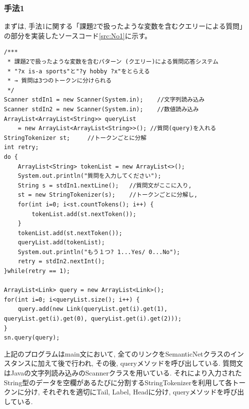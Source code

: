 ﻿\documentclass[uplatex,12pt]{jsarticle}
\begin{document}
\subsubsection{手法1}
まずは, 手法1に関する「課題2で扱ったような変数を含むクエリーによる質問」の部分を実装したソースコード\ref{src:No1}に示す。
\begin{lstlisting}[caption=クエリーの形に添った質問応答, label=src:No1]
/***
 * 課題2で扱ったような変数を含むパターン (クエリー)による質問応答システム
 * "?x is-a sports"と"?y hobby ?x"をとらえる
 * → 質問は3つのトークンに分けられる
 */
Scanner stdIn1 = new Scanner(System.in);	//文字列読み込み
Scanner stdIn2 = new Scanner(System.in);	//数値読み込み
ArrayList<ArrayList<String>> queryList 
    = new ArrayList<ArrayList<String>>(); //質問(query)を入れる
StringTokenizer st;		//トークンごとに分解
int retry;
do {
	ArrayList<String> tokenList = new ArrayList<>();
	System.out.println("質問を入力してください");
	String s = stdIn1.nextLine(); 	//質問文がここに入り,
	st = new StringTokenizer(s);	//トークンごとに分解し,
	for(int i=0; i<st.countTokens(); i++) {
		tokenList.add(st.nextToken());
	}
	tokenList.add(st.nextToken());
	queryList.add(tokenList);
	System.out.println("もう１つ? 1...Yes/ 0...No");
	retry = stdIn2.nextInt();
}while(retry == 1);

ArrayList<Link> query = new ArrayList<Link>();
for(int i=0; i<queryList.size(); i++) {
	query.add(new Link(queryList.get(i).get(1), queryList.get(i).get(0), queryList.get(i).get(2)));
}
sn.query(query);
\end{lstlisting}

上記のプログラムはmain文において, 全てのリンクをSemanticNetクラスのインスタンスに加えて後で行われ, その後, queryメソッドを呼び出している. 質問文はJavaの文字列読み込みのScannerクラスを用いている. それにより入力されたString型のデータを空欄があるたびに分割するStringTokenizerを利用して各トークンに分け, それぞれを適切にTail, Label, Headに分け, queryメソッドを呼び出している.
\end{document}
